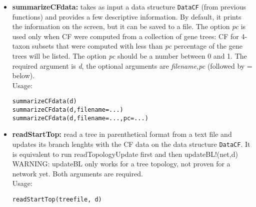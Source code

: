 \documentclass[12pt]{article}
\begin{document}
\begin{itemize}
\item \textbf{summarizeCFdata:} takes as input a data structure \texttt{DataCF} (from
  previous functions) and provides a few descriptive information. By
  default, it prints the information on the screen, but it can be
  saved to a file. The option \textit{pc} is used only when CF were
  computed from a collection of gene trees: CF for 4-taxon subsets
  that were computed with less than \textit{pc} percentage of the gene
  trees will be listed. The option \textit{pc} should be a number
  between 0 and 1. The required argument is \textit{d}, the optional
  arguments are \textit{filename,pc} (followed by = below).\\
Usage:
\begin{lstlisting}
summarizeCFdata(d)
summarizeCFdata(d,filename=...)
summarizeCFdata(d,filename=...,pc=...)
\end{lstlisting}

\item \textbf{readStartTop:} read a tree in parenthetical format from
  a text file and updates its branch lenghts with the CF data on
  the data structure \texttt{DataCF}. It is equivalent to run
  readTopologyUpdate first and then updateBL!(net,d)\\
  WARNING: updateBL only works for a tree topology, not proven for a
  network yet. Both arguments are required.\\  Usage:
\begin{lstlisting}
readStartTop(treefile, d)
\end{lstlisting}

\end{itemize}
\end{document}
